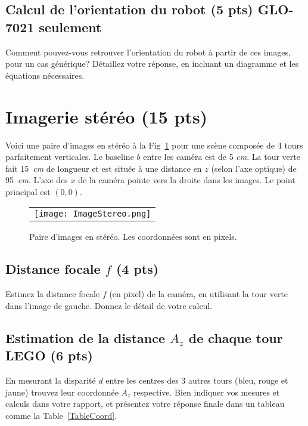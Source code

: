 \documentclass[12pt]{article}
\begin{document}
\subsection{Calcul de l'orientation du robot  (5 pts) GLO-7021 seulement}
Comment pouvez-vous retrouver l'orientation du robot à partir de ces images, pour un cas générique? Détaillez votre réponse, en incluant un diagramme et les équations nécessaires. 


\newpage
\section{Imagerie stéréo  (15 pts)}
Voici une paire d'images en stéréo à la Fig~\ref{ImageStereo} pour une scène composée de 4 tours parfaitement verticales. Le baseline $b$ entre les caméra est de 5 \emph{cm}. La tour verte fait 15~\emph{cm} de longueur et est située à une distance en $z$ (selon l'axe optique) de 95~\emph{cm}. L'axe des $x$ de la caméra pointe vers la droite dans les images. Le point principal est $(0,0)$.

\begin{figure}[ht]
 \begin{center}
  \begin{tabular}{c}
    \texttt{[image: ImageStereo.png]} 
  \end{tabular}
 \end{center}
\vspace{-0.3in}
 \caption{Paire d'images en stéréo. Les coordonnées sont en pixels.}
 \label{ImageStereo}
\end{figure}


\subsection{Distance focale $f$ (4 pts)}
Estimez la distance focale $f$ (en pixel) de la caméra, en utilisant la tour verte dans l'image de gauche. Donnez le détail de votre calcul.

\subsection{Estimation de la distance $A_z$ de chaque tour LEGO (6 pts)}
En mesurant la disparité $d$ entre les centres des 3 autres tours (bleu, rouge et jaune) trouvez leur coordonnée $A_z$ respective. Bien indiquer vos mesures et calculs dans votre rapport, et présentez votre réponse finale dans un tableau comme la Table~\ref{TableCoord}.
\end{document}
